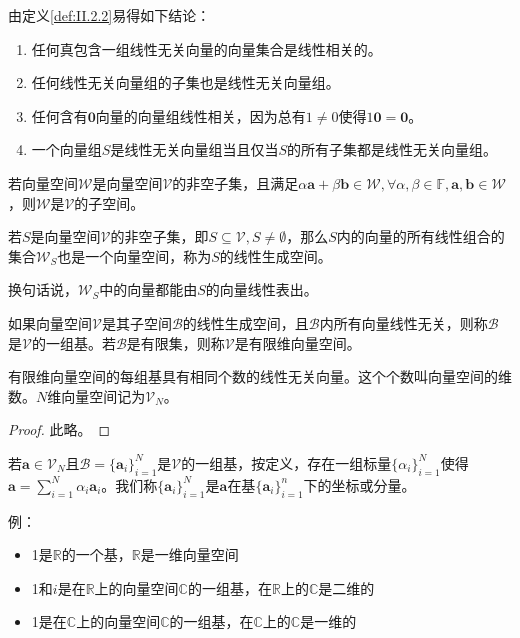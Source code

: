 \documentclass[main.tex]{subfiles}
\begin{document}
由定义\ref{def:II.2.2}易得如下结论：
\begin{enumerate}
    \item 任何真包含一组线性无关向量的向量集合是线性相关的\cite[定理3.1、3.2, p.~98]{周胜林2012线性代数}。
    \item 任何线性无关向量组的子集也是线性无关向量组。
    \item 任何含有$\mathbf{0}$向量的向量组线性相关，因为总有$1\neq 0$使得$1\mathbf{0}=\mathbf{0}$。
    \item 一个向量组$S$是线性无关向量组当且仅当$S$的所有子集都是线性无关向量组。
\end{enumerate}

\begin{definition}[子空间]\label{def:II.2.3}
若向量空间$\mathcal{W}$是向量空间$\mathcal{V}$的非空子集，且满足$\alpha\mathbf{a}+\beta\mathbf{b}\in\mathcal{W},\forall\alpha,\beta\in\mathbb{F},\mathbf{a},\mathbf{b}\in\mathcal{W}$，则$\mathcal{W}$是$\mathcal{V}$的子空间。
\end{definition}

\begin{definition}[线性生成空间]\label{def:II.2.4}
若$S$是向量空间$\mathcal{V}$的非空子集，即$S\subseteq\mathcal{V},S\neq\emptyset$，那么$S$内的向量的所有线性组合的集合$\mathcal{W}_S$也是一个向量空间，称为$S$的线性生成空间。
\end{definition}

换句话说，$\mathcal{W}_S$中的向量都能由$S$的向量线性表出。

\begin{definition}[基]
如果向量空间$\mathcal{V}$是其子空间$\mathcal{B}$的线性生成空间，且$\mathcal{B}$内所有向量线性无关，则称$\mathcal{B}$是$\mathcal{V}$的一组基。若$\mathcal{B}$是有限集，则称$\mathcal{V}$是有限维向量空间。
\end{definition}

\begin{theorem}
有限维向量空间的每组基具有相同个数的线性无关向量。这个个数叫向量空间的维数。$N$维向量空间记为$\mathcal{V}_N$。
\end{theorem}
\begin{proof}
此略\cite[“(3)的证明”，p.~171]{周胜林2012线性代数}。
\end{proof}

\begin{definition}[向量在给定基下的坐标]\label{def:II.2.6}
若$\mathbf{a}\in\mathcal{V}_N$且$\mathcal{B}=\{\mathbf{a}_i\}_{i=1}^N$是$\mathcal{V}$的一组基，按定义，存在一组标量$\{\alpha_i\}_{i=1}^N$使得$\mathbf{a}=\sum_{i=1}^N\alpha_i\mathbf{a}_i$。我们称$\{\mathbf{a}_i\}_{i=1}^N$是$\mathbf{a}$在基$\{\mathbf{a}_i\}_{i=1}^n$下的坐标或分量。
\end{definition}

例：
\begin{itemize}
    \item 1是$\mathbb{R}$的一个基，$\mathbb{R}$是一维向量空间
    \item 1和$i$是在$\mathbb{R}$上的向量空间$\mathbb{C}$的一组基，在$\mathbb{R}$上的$\mathbb{C}$是二维的
    \item 1是在$\mathbb{C}$上的向量空间$\mathbb{C}$的一组基，在$\mathbb{C}$上的$\mathbb{C}$是一维的
\end{itemize}
\end{document}
